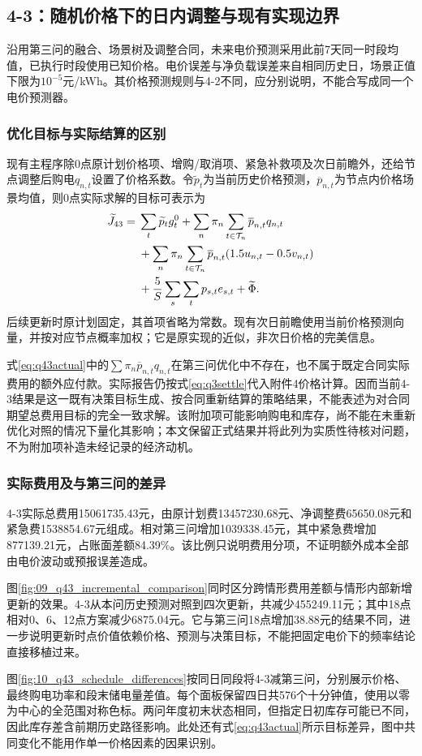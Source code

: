 \subsection{4-3：随机价格下的日内调整与现有实现边界}
沿用第三问的融合、场景树及调整合同，未来电价预测采用此前7天同一时段均值，已执行时段使用已知价格。电价误差与净负载误差来自相同历史日，场景正值下限为$10^{-5}$元/kWh。其价格预测规则与4-2不同，应分别说明，不能合写成同一个电价预测器。

\subsubsection{优化目标与实际结算的区别}\label{sec:q43objective}
现有主程序除0点原计划价格项、增购/取消项、紧急补救项及次日前瞻外，还给节点调整后购电$q_{n,t}$设置了价格系数。令$\widetilde p_t$为当前历史价格预测，$\overline p_{n,t}$为节点内价格场景均值，则0点实际求解的目标可表示为
\begin{align}
\widetilde J_{43}={}&\sum_t\widetilde p_t g_t^0
+\sum_n\pi_n\sum_{t\in\mathcal T_n}\overline p_{n,t}q_{n,t}\notag\\
&+\sum_n\pi_n\sum_{t\in\mathcal T_n}\overline p_{n,t}(1.5u_{n,t}-0.5v_{n,t})\notag\\
&+\frac5S\sum_s\sum_t p_{s,t}e_{s,t}+\widetilde\Phi.\label{eq:q43actual}
\end{align}
后续更新时原计划固定，其首项省略为常数。现有次日前瞻使用当前价格预测向量，并按对应节点概率加权；它是原实现的近似，非次日价格的完美信息。

式\eqref{eq:q43actual}中的$\sum\pi_n\overline p_{n,t}q_{n,t}$在第三问优化中不存在，也不属于既定合同实际费用的额外应付款。实际报告仍按式\eqref{eq:q3settle}代入附件4价格计算。因而当前4-3结果是这一既有决策目标生成、按合同重新结算的策略结果，不能表述为对合同期望总费用目标的完全一致求解。该附加项可能影响购电和库存，尚不能在未重新优化对照的情况下量化其影响；本文保留正式结果并将此列为实质性待核对问题，不为附加项补造未经记录的经济动机。

\subsubsection{实际费用及与第三问的差异}

4-3实际总费用15061735.43元，由原计划费13457230.68元、净调整费65650.08元和紧急费1538854.67元组成。相对第三问增加1039338.45元，其中紧急费增加877139.21元，占账面差额84.39\%。该比例只说明费用分项，不证明额外成本全部由电价波动或预报误差造成。

图\ref{fig:09_q43_incremental_comparison}同时区分跨情形费用差额与情形内部新增更新的效果。4-3从本问历史预测对照到四次更新，共减少455249.11元；其中18点相对0、6、12点方案减少6875.04元。它与第三问18点增加38.88元的结果不同，进一步说明更新时点价值依赖价格、预测与决策目标，不能把固定电价下的频率结论直接移植过来。


图\ref{fig:10_q43_schedule_differences}按同日同段将4-3减第三问，分别展示价格、最终购电功率和段末储电量差值。每个面板保留四日共576个十分钟值，使用以零为中心的全范围对称色标。两问年度初末状态相同，但指定日初库存可能已不同，因此库存差含前期历史路径影响。此处还有式\eqref{eq:q43actual}所示目标差异，图中共同变化不能用作单一价格因素的因果识别。
\FloatBarrier
